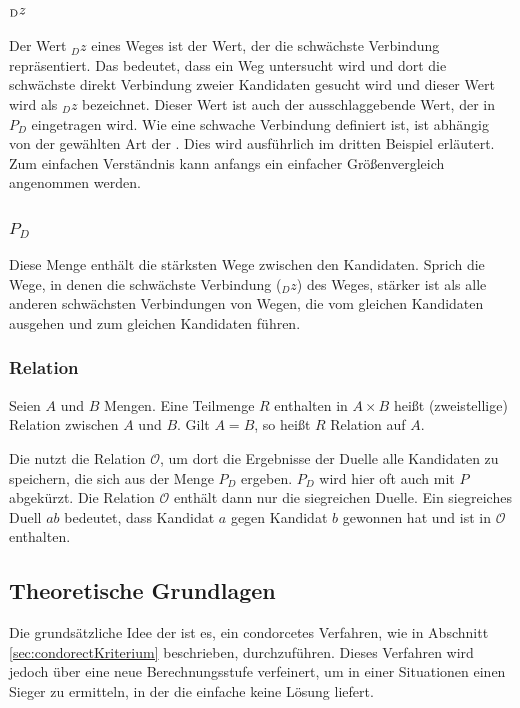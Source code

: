 \subsubsection{$\textsubscript{D}z$}
\label{dz}
Der Wert $_{D}z$ eines Weges ist der Wert, der die schwächste Verbindung repräsentiert. Das bedeutet, dass ein Weg untersucht wird und dort die schwächste direkt Verbindung zweier Kandidaten gesucht wird und dieser Wert wird als $_{D}z$ bezeichnet. Dieser Wert ist auch der ausschlaggebende Wert, der in  $P_{D}$ eingetragen wird. Wie eine schwache Verbindung definiert ist, ist abhängig von der gewählten Art der \schulze. Dies wird ausführlich im dritten Beispiel erläutert. Zum einfachen Verständnis kann anfangs ein einfacher Größenvergleich angenommen werden.

\subsubsection{$P_{D}$}
\label{PD}
Diese Menge enthält die stärksten Wege zwischen den Kandidaten. Sprich die Wege, in denen die schwächste Verbindung ($_{D}z$) des Weges, stärker ist als alle anderen schwächsten Verbindungen von Wegen, die vom gleichen Kandidaten ausgehen und zum gleichen Kandidaten führen.

\subsubsection{Relation}
\label{relation}
\glqq Seien $A$ und $B$ Mengen. Eine Teilmenge $R$ enthalten in $A \times B$ heißt (zweistellige) Relation zwischen $A$ und $B$. Gilt $A = B$, so heißt $R$ Relation auf $A$.\grqq{} \citet{Lang2018}

Die \schulze nutzt die Relation $\mathcal{O}$, um dort die Ergebnisse der Duelle alle Kandidaten zu speichern, die sich aus der Menge $P_{D}$ ergeben. $P_{D}$ wird hier oft auch mit $P$ abgekürzt. Die  Relation $\mathcal{O}$ enthält dann nur die siegreichen Duelle. Ein siegreiches Duell $ab$ bedeutet, dass Kandidat $a$ gegen Kandidat $b$ gewonnen hat und ist in $\mathcal{O}$ enthalten.

\newpage
\subsection{Theoretische Grundlagen} 
\label{sec:theoretische Grundlagen}

Die grundsätzliche Idee der \schulze ist es, ein condorcetes Verfahren, wie in Abschnitt \ref{sec:condorectKriterium} beschrieben, durchzuführen. Dieses Verfahren wird jedoch über eine neue Berechnungsstufe verfeinert, um in einer Situationen einen Sieger zu ermitteln, in der die einfache \condorcetMethode keine Lösung liefert.

